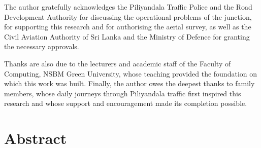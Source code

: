 The author gratefully acknowledges the Piliyandala Traffic Police and the Road Development Authority for discussing the operational problems of the junction, for supporting this research and for authorising the aerial survey, as well as the Civil Aviation Authority of Sri Lanka and the Ministry of Defence for granting the necessary approvals.

Thanks are also due to the lecturers and academic staff of the Faculty of Computing, NSBM Green University, whose teaching provided the foundation on which this work was built. Finally, the author owes the deepest thanks to family members, whose daily journeys through Piliyandala traffic first inspired this research and whose support and encouragement made its completion possible.

\chapter*{Abstract}

